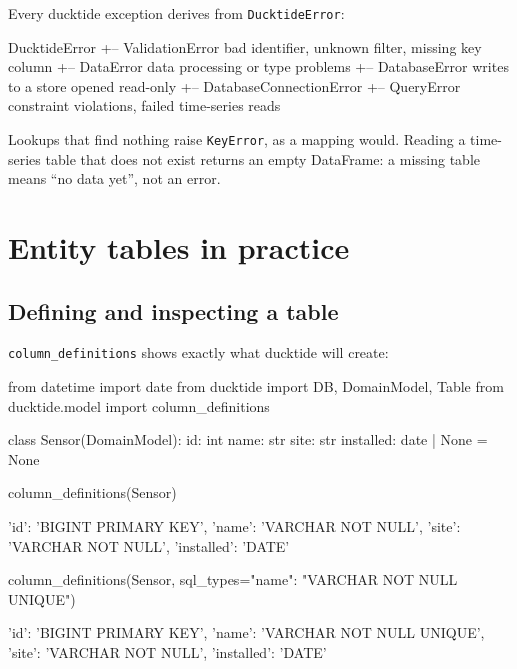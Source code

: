 \documentclass[11pt,a4paper]{article}
\newcommand{\code}[1]{\texttt{#1}}
\begin{document}
Every ducktide exception derives from \code{DucktideError}:

\begin{console}
DucktideError
 +-- ValidationError          bad identifier, unknown filter, missing key column
 +-- DataError                data processing or type problems
 +-- DatabaseError          writes to a store opened read-only
      +-- DatabaseConnectionError
      +-- QueryError          constraint violations, failed time-series reads
\end{console}

Lookups that find nothing raise \code{KeyError}, as a mapping would. Reading a time-series
table that does not exist returns an empty DataFrame: a missing table means ``no data
yet'', not an error.

\section{Entity tables in practice}

\subsection{Defining and inspecting a table}

\code{column\_definitions} shows exactly what ducktide will create:

\begin{python}
from datetime import date
from ducktide import DB, DomainModel, Table
from ducktide.model import column_definitions

class Sensor(DomainModel):
    id: int
    name: str
    site: str
    installed: date | None = None

column_definitions(Sensor)
\end{python}
\begin{console}
{'id': 'BIGINT PRIMARY KEY', 'name': 'VARCHAR NOT NULL',
 'site': 'VARCHAR NOT NULL', 'installed': 'DATE'}
\end{console}

\begin{python}
column_definitions(Sensor, sql_types={"name": "VARCHAR NOT NULL UNIQUE"})
\end{python}
\begin{console}
{'id': 'BIGINT PRIMARY KEY', 'name': 'VARCHAR NOT NULL UNIQUE',
 'site': 'VARCHAR NOT NULL', 'installed': 'DATE'}
\end{console}
\end{document}
